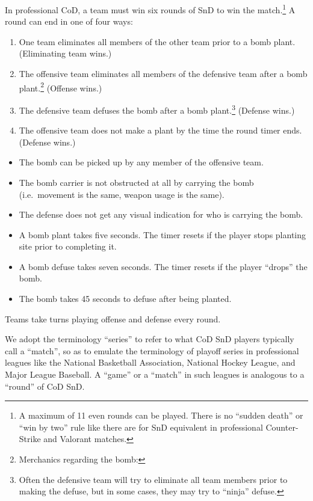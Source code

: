 \documentclass[
]{article}
\providecommand{\tightlist}{%
  \setlength{\itemsep}{0pt}\setlength{\parskip}{0pt}}\usepackage{longtable,booktabs,array}
\begin{document}
In professional CoD, a team must win six rounds of SnD to win the
match.\footnote{A maximum of 11 even rounds can be played. There is no
  ``sudden death'' or ``win by two'' rule like there are for SnD
  equivalent in professional Counter-Strike and Valorant matches.} A
round can end in one of four ways:

\begin{enumerate}
\def\labelenumi{\arabic{enumi}.}
\tightlist
\item
  One team eliminates all members of the other team prior to a bomb
  plant. (Eliminating team wins.)
\item
  The offensive team eliminates all members of the defensive team after
  a bomb plant.\footnote{Merchanics regarding the bomb:} (Offense wins.)
\item
  The defensive team defuses the bomb after a bomb plant.\footnote{Often
    the defensive team will try to eliminate all team members prior to
    making the defuse, but in some cases, they may try to ``ninja''
    defuse.} (Defense wins.)
\item
  The offensive team does not make a plant by the time the round timer
  ends. (Defense wins.)
\end{enumerate}

\begin{itemize}
\tightlist
\item
  The bomb can be picked up by any member of the offensive team.
\item
  The bomb carrier is not obstructed at all by carrying the bomb
  (i.e.~movement is the same, weapon usage is the same).
\item
  The defense does not get any visual indication for who is carrying the
  bomb.
\item
  A bomb plant takes five seconds. The timer resets if the player stops
  planting site prior to completing it.
\item
  A bomb defuse takes seven seconds. The timer resets if the player
  ``drops'' the bomb.
\item
  The bomb takes 45 seconds to defuse after being planted.
\end{itemize}

Teams take turns playing offense and defense every round.

We adopt the terminology ``series'' to refer to what CoD SnD players
typically call a ``match'', so as to emulate the terminology of playoff
series in professional leagues like the National Basketball Association,
National Hockey League, and Major League Baseball. A ``game'' or a
``match'' in such leagues is analogous to a ``round'' of CoD SnD.
\end{document}
